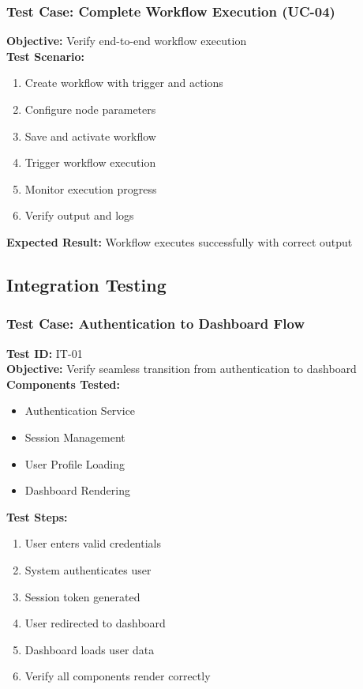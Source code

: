 \documentclass[12pt,a4paper]{article}
\begin{document}
\subsubsection{Test Case: Complete Workflow Execution (UC-04)}
\textbf{Objective:} Verify end-to-end workflow execution\\
\textbf{Test Scenario:}
\begin{enumerate}
    \item Create workflow with trigger and actions
    \item Configure node parameters
    \item Save and activate workflow
    \item Trigger workflow execution
    \item Monitor execution progress
    \item Verify output and logs
\end{enumerate}
\textbf{Expected Result:} Workflow executes successfully with correct output

\newpage

\subsection{Integration Testing}

\subsubsection{Test Case: Authentication to Dashboard Flow}
\textbf{Test ID:} IT-01\\
\textbf{Objective:} Verify seamless transition from authentication to dashboard\\
\textbf{Components Tested:}
\begin{itemize}
    \item Authentication Service
    \item Session Management
    \item User Profile Loading
    \item Dashboard Rendering
\end{itemize}

\textbf{Test Steps:}
\begin{enumerate}
    \item User enters valid credentials
    \item System authenticates user
    \item Session token generated
    \item User redirected to dashboard
    \item Dashboard loads user data
    \item Verify all components render correctly
\end{enumerate}
\end{document}
